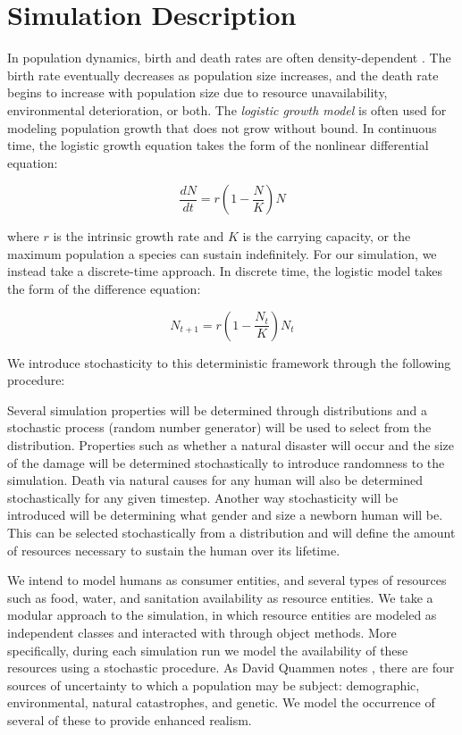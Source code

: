 \documentclass[12pt]{article}
\begin{document}
\section{Simulation Description}
\label{sec:simdescrip}

In population dynamics, birth and death rates are often density-dependent
\cite{guckenheimer1977dynamics}. The birth rate eventually decreases as
population size increases, and the death rate begins to increase with
population size due to resource unavailability, environmental deterioration, or
both. The \textit{logistic growth model} is often used for modeling population
growth that does not grow without bound. In continuous time, the logistic growth
equation takes the form of the nonlinear differential equation:

\begin{equation}
  \frac{dN}{dt} = r\left(1-\frac{N}{K}\right)N
\end{equation}

where $r$ is the intrinsic growth rate and $K$ is the carrying capacity, or the
maximum population a species can sustain indefinitely. For our simulation, we
instead take a discrete-time approach. In discrete time, the logistic model
takes the form of the difference equation:

\begin{equation}
  \label{eq:logisticdiff}
  N_{t+1} = r\left(1-\frac{N_t}{K}\right)N_t
\end{equation}

We introduce stochasticity to this deterministic framework through the following
procedure:

Several simulation properties will be determined through distributions and a stochastic process (random number generator) will be used to select from the distribution.  Properties such as whether a natural disaster will occur and the size of the damage will be determined stochastically to introduce randomness to the simulation.  Death via natural causes for any human will also be determined stochastically for any given timestep.  Another way stochasticity will be introduced will be determining what gender and size a newborn human will be.  This can be selected stochastically from a distribution and will define the amount of resources necessary to sustain the human over its lifetime.

We intend to model humans as consumer entities, and several types of resources
such as food, water, and sanitation availability as resource entities. We take
a modular approach to the simulation, in which resource entities are modeled as
independent classes and interacted with through object methods. More
specifically, during each simulation run we model the availability of these
resources using a stochastic procedure. As David Quammen notes
\cite{quammen1996song}, there are four sources of uncertainty to which a
population may be subject: demographic, environmental, natural catastrophes, and
genetic. We model the occurrence of several of these to provide enhanced
realism.
\end{document}
